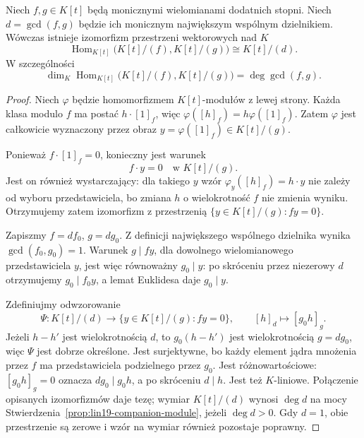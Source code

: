 \begin{twierdzenie}
\label{thm:lin21-hom-cyclic}
Niech \(f,g\in K[t]\) będą monicznymi
wielomianami dodatnich stopni.
Niech \(d=\gcd(f,g)\) będzie
ich monicznym największym wspólnym
dzielnikiem.
Wówczas istnieje izomorfizm
przestrzeni wektorowych nad \(K\)
\[
 \operatorname{Hom}_{K[t]}
 \bigl(K[t]/(f),K[t]/(g)\bigr)
 \cong K[t]/(d).
\]
W szczególności
\[
 \dim_K\operatorname{Hom}_{K[t]}
 \bigl(K[t]/(f),K[t]/(g)\bigr)
 =\deg\gcd(f,g).
\]
\end{twierdzenie}
\begin{proof}
Niech \(\varphi\) będzie homomorfizmem
\(K[t]\)-modułów z lewej strony.
Każda klasa modulo \(f\) ma postać
\(h\cdot[1]_f\), więc
\(\varphi([h]_f)=h\varphi([1]_f)\).
Zatem \(\varphi\) jest całkowicie
wyznaczony przez obraz
\(y=\varphi([1]_f)\in K[t]/(g)\).

Ponieważ \(f\cdot[1]_f=0\),
konieczny jest warunek
\[
 f\cdot y=0\quad\text{w }K[t]/(g).
\]
Jest on również wystarczający:
dla takiego \(y\) wzór
\(\varphi_y([h]_f)=h\cdot y\)
nie zależy od wyboru przedstawiciela,
bo zmiana \(h\) o wielokrotność \(f\)
nie zmienia wyniku.
Otrzymujemy zatem izomorfizm
z przestrzenią
\(\{y\in K[t]/(g):fy=0\}\).

Zapiszmy \(f=df_0\), \(g=dg_0\).
Z definicji największego wspólnego
dzielnika wynika
\(\gcd(f_0,g_0)=1\).
Warunek \(g\mid fy\), dla dowolnego
wielomianowego przedstawiciela \(y\),
jest więc równoważny \(g_0\mid y\):
po skróceniu przez niezerowy \(d\)
otrzymujemy \(g_0\mid f_0y\),
a lemat Euklidesa daje \(g_0\mid y\).

Zdefiniujmy odwzorowanie
\[
 \Psi\colon K[t]/(d)\longrightarrow
 \{y\in K[t]/(g):fy=0\},\qquad
 [h]_d\longmapsto[g_0h]_g.
\]
Jeżeli \(h-h'\) jest wielokrotnością
\(d\), to \(g_0(h-h')\) jest
wielokrotnością \(g=dg_0\),
więc \(\Psi\) jest dobrze określone.
Jest surjektywne, bo każdy element
jądra mnożenia przez \(f\) ma
przedstawiciela podzielnego przez \(g_0\).
Jest różnowartościowe:
\([g_0h]_g=0\) oznacza
\(dg_0\mid g_0h\), a po skróceniu
\(d\mid h\).
Jest też \(K\)-liniowe.
Połączenie opisanych izomorfizmów
daje tezę; wymiar \(K[t]/(d)\)
wynosi \(\deg d\) na mocy
Stwierdzenia~\ref{prop:lin19-companion-module},
jeżeli \(\deg d>0\).
Gdy \(d=1\), obie przestrzenie
są zerowe i wzór na wymiar
również pozostaje poprawny.
\end{proof}

